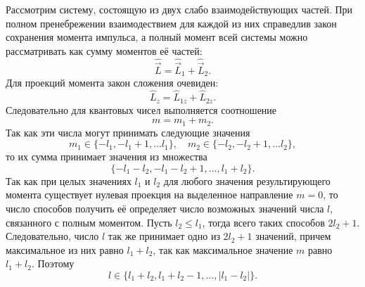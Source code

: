 
Рассмотрим систему, состоящую из двух слабо взаимодействующих частей. При полном
пренебрежении взаимодествием для каждой из них справедлив закон сохранения
момента импульса, а полный момент всей системы можно рассматривать как сумму
моментов её частей:
\[
    \hat{\vec{L}} = \hat{\vec{L}}_1 + \hat{\vec{L}}_2.
\]
Для проекций момента закон сложения очевиден:
\[
    \hat{L}_z = \hat{L}_{1z} + \hat{L}_{2z}.
\]
Следовательно для квантовых чисел выполняется соотношение
\[
    m = m_1 + m_2.
\]
Так как эти числа могут принимать следующие значения
\[
    m_1 \in \{-l_1, -l_1 + 1, \ldots l_1 \}, \quad
    m_2 \in \{-l_2, -l_2 + 1, \ldots l_2 \},
\]
то их сумма принимает значения из множества
\[
    \{ -l_1-l_2, -l_1-l_2+1, \ldots,  l_1+l_2 \}.
\]
Так как при целых значениях \( l_1 \) и \( l_2 \)  для любого значения
результирующего момента существует нулевая проекция на выделенное направление
\( m = 0 \), то число способов получить её определяет число возможных значений
числа \( l \), связанного с полным моментом. Пусть \( l_2 \le l_1 \), тогда
всего таких способов \( 2l_2+1 \). Следовательно, число \( l \) так же принимает
одно из \( 2l_2+1 \) значений, причем максимальное из них равно \( l_1 + l_2 \),
так как максимальное значение \( m \) равно \( l_1+l_2 \). Поэтому
\[
    l \in \{ l_1+l_2, l_1+l_2-1, \ldots, |l_1-l_2| \}. 
\]

